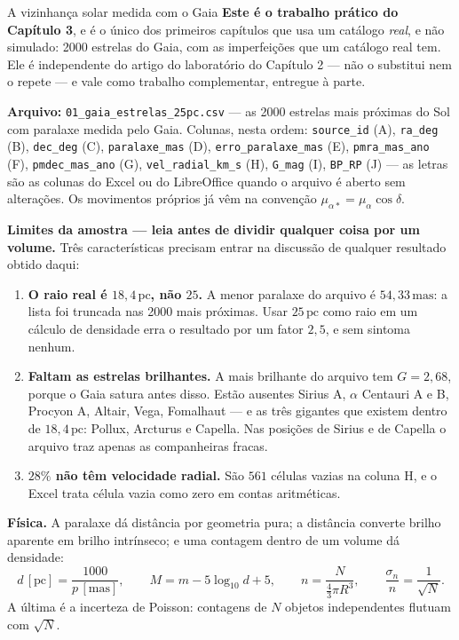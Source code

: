 \documentclass[11pt,a4paper]{article}
\begin{document}
\begin{lessonblock}[borderline west={2pt}{0pt}{astroBlue}]{A vizinhança solar medida com o Gaia}
\textbf{Este é o trabalho prático do Capítulo 3}, e é o único dos primeiros capítulos que usa um catálogo \emph{real}, e não simulado: 2000 estrelas do Gaia, com as imperfeições que um catálogo real tem. Ele é independente do artigo do laboratório do Capítulo 2 --- não o substitui nem o repete --- e vale como trabalho complementar, entregue à parte.

\textbf{Arquivo:} \texttt{01\_gaia\_estrelas\_25pc.csv} --- as 2000 estrelas mais próximas
do Sol com paralaxe medida pelo Gaia. Colunas, nesta ordem: \texttt{source\_id} (A),
\texttt{ra\_deg} (B), \texttt{dec\_deg} (C), \texttt{paralaxe\_mas} (D),
\texttt{erro\_paralaxe\_mas} (E), \texttt{pmra\_mas\_ano} (F), \texttt{pmdec\_mas\_ano} (G),
\texttt{vel\_radial\_km\_s} (H), \texttt{G\_mag} (I), \texttt{BP\_RP} (J) --- as letras são
as colunas do Excel ou do LibreOffice quando o arquivo é aberto sem alterações. Os
movimentos próprios já vêm na convenção $\mu_{\alpha*}=\mu_\alpha\cos\delta$.

\textbf{Limites da amostra --- leia antes de dividir qualquer coisa por um volume.}
Três características precisam entrar na discussão de qualquer resultado obtido daqui:

\begin{enumerate}
\item \textbf{O raio real é $18{,}4\,\mathrm{pc}$, não $25$.} A menor paralaxe do arquivo é
$54{,}33\,\mathrm{mas}$: a lista foi truncada nas 2000 mais próximas. Usar $25\,\mathrm{pc}$
como raio em um cálculo de densidade erra o resultado por um fator $2{,}5$, e sem sintoma
nenhum.
\item \textbf{Faltam as estrelas brilhantes.} A mais brilhante do arquivo tem $G=2{,}68$,
porque o Gaia satura antes disso. Estão ausentes Sirius A, $\alpha$ Centauri A e B,
Procyon A, Altair, Vega, Fomalhaut --- e as três gigantes que existem dentro de
$18{,}4\,\mathrm{pc}$: Pollux, Arcturus e Capella. Nas posições de Sirius e de Capella o
arquivo traz apenas as companheiras fracas.
\item \textbf{$28\%$ não têm velocidade radial.} São $561$ células vazias na coluna H, e o
Excel trata célula vazia como zero em contas aritméticas.
\end{enumerate}

\textbf{Física.} A paralaxe dá distância por geometria pura; a distância converte brilho
aparente em brilho intrínseco; e uma contagem dentro de um volume dá densidade:
\[
d\,[\mathrm{pc}]=\frac{1000}{p\,[\mathrm{mas}]},\qquad
M=m-5\log_{10} d+5,\qquad
n=\frac{N}{\tfrac{4}{3}\pi R^{3}},\qquad
\frac{\sigma_n}{n}=\frac{1}{\sqrt{N}} .
\]
A última é a incerteza de Poisson: contagens de $N$ objetos independentes flutuam com
$\sqrt{N}$.


\end{lessonblock}
\end{document}
